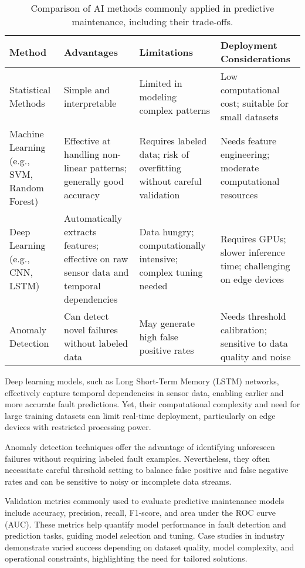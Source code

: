 \documentclass[sigconf]{acmart}
\begin{document}
\begin{table*}[htbp]
\centering
\caption{Comparison of AI methods commonly applied in predictive maintenance, including their trade-offs.}
\label{tab:pm_methods}
\begin{adjustbox}{max width=\textwidth}
\begin{tabular}{@{}llll@{}}
\toprule
Method & Advantages & Limitations & Deployment Considerations \\ \midrule
Statistical Methods & Simple and interpretable & Limited in modeling complex patterns & Low computational cost; suitable for small datasets \\
Machine Learning (e.g., SVM, Random Forest) & Effective at handling non-linear patterns; generally good accuracy & Requires labeled data; risk of overfitting without careful validation & Needs feature engineering; moderate computational resources \\
Deep Learning (e.g., CNN, LSTM) & Automatically extracts features; effective on raw sensor data and temporal dependencies & Data hungry; computationally intensive; complex tuning needed & Requires GPUs; slower inference time; challenging on edge devices \\
Anomaly Detection & Can detect novel failures without labeled data & May generate high false positive rates & Needs threshold calibration; sensitive to data quality and noise \\ \bottomrule
\end{tabular}
\end{adjustbox}
\end{table*}

Deep learning models, such as Long Short-Term Memory (LSTM) networks, effectively capture temporal dependencies in sensor data, enabling earlier and more accurate fault predictions. Yet, their computational complexity and need for large training datasets can limit real-time deployment, particularly on edge devices with restricted processing power. 

Anomaly detection techniques offer the advantage of identifying unforeseen failures without requiring labeled fault examples. Nevertheless, they often necessitate careful threshold setting to balance false positive and false negative rates and can be sensitive to noisy or incomplete data streams.

Validation metrics commonly used to evaluate predictive maintenance models include accuracy, precision, recall, F1-score, and area under the ROC curve (AUC). These metrics help quantify model performance in fault detection and prediction tasks, guiding model selection and tuning. Case studies in industry demonstrate varied success depending on dataset quality, model complexity, and operational constraints, highlighting the need for tailored solutions.
\end{document}
